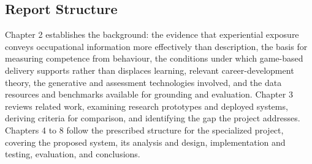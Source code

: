 \subsection{Report Structure}

Chapter 2 establishes the background: the evidence that experiential exposure conveys occupational information more effectively than description, the basis for measuring competence from behaviour, the conditions under which game-based delivery supports rather than displaces learning, relevant career-development theory, the generative and assessment technologies involved, and the data resources and benchmarks available for grounding and evaluation. Chapter 3 reviews related work, examining research prototypes and deployed systems, deriving criteria for comparison, and identifying the gap the project addresses. Chapters 4 to 8 follow the prescribed structure for the specialized project, covering the proposed system, its analysis and design, implementation and testing, evaluation, and conclusions.
